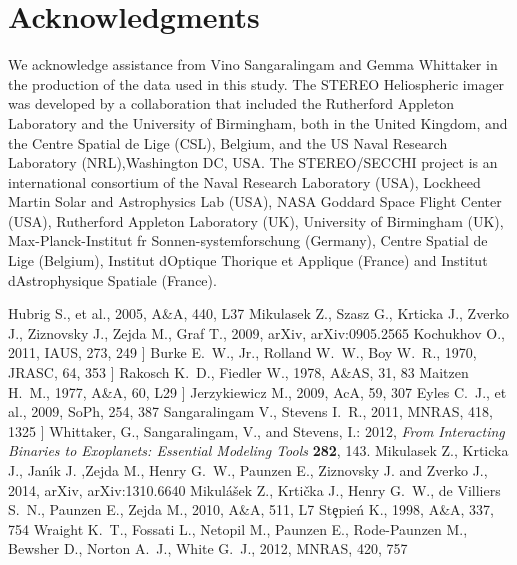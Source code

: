 \documentclass[]{article}
\begin{document}
\section*{Acknowledgments}
We acknowledge assistance from Vino Sangaralingam and Gemma Whittaker in the production of the data used in this study. The STEREO Heliospheric imager was developed by a collaboration that included the Rutherford Appleton Laboratory and the University of Birmingham, both in the United Kingdom, and the Centre Spatial de Lige (CSL), Belgium, and the US Naval Research Laboratory (NRL),Washington DC, USA. The STEREO/SECCHI project is an international consortium of the Naval Research Laboratory (USA), Lockheed Martin Solar and Astrophysics Lab (USA), NASA Goddard  Space Flight Center (USA), Rutherford Appleton Laboratory (UK), University of Birmingham (UK), Max-Planck-Institut fr Sonnen-systemforschung (Germany), Centre Spatial de Lige (Belgium), Institut dOptique Thorique et Applique (France) and Institut dAstrophysique Spatiale (France). 



\begin{thebibliography}{}

 Hubrig S., et al., 2005, A\&A, 440, L37 
 Mikulasek Z., Szasz G., Krticka J., Zverko J., Ziznovsky J., Zejda M., Graf T., 2009, arXiv, arXiv:0905.2565
 Kochukhov O., 2011, IAUS, 273, 249 
] Burke E.~W., Jr., Rolland W.~W., Boy W.~R., 1970, JRASC, 64, 353 
] Rakosch K.~D., Fiedler W., 1978, A\&AS, 31, 83 
 Maitzen H.~M., 1977, A\&A, 60, L29 
] Jerzykiewicz M., 2009, AcA, 59, 307
 Eyles C.~J., et al., 2009, SoPh, 254, 387 
 Sangaralingam V., Stevens I.~R., 2011, MNRAS, 418, 1325 
] Whittaker, G., Sangaralingam, V., and Stevens, I.: 2012, {\it From Interacting Binaries to Exoplanets: Essential Modeling Tools} {\bf 282}, 143.
 Mikulasek Z., Krticka J., Jan{\'{\i}}k J. ,Zejda M., Henry G.~W., Paunzen E., Ziznovsky J. and Zverko J., 2014, arXiv, arXiv:1310.6640
 Mikul{\'a}{\v s}ek Z., Krti{\v c}ka J., Henry G.~W., de Villiers S.~N., Paunzen E., Zejda M., 2010, A\&A, 511, L7 
 St{\c e}pie{\'n} K., 1998, A\&A, 337, 754
 Wraight K.~T., Fossati L., Netopil M., Paunzen E., Rode-Paunzen M., Bewsher D., Norton A.~J., White G.~J., 2012, MNRAS, 420, 757 
\end{thebibliography}
\end{document}
